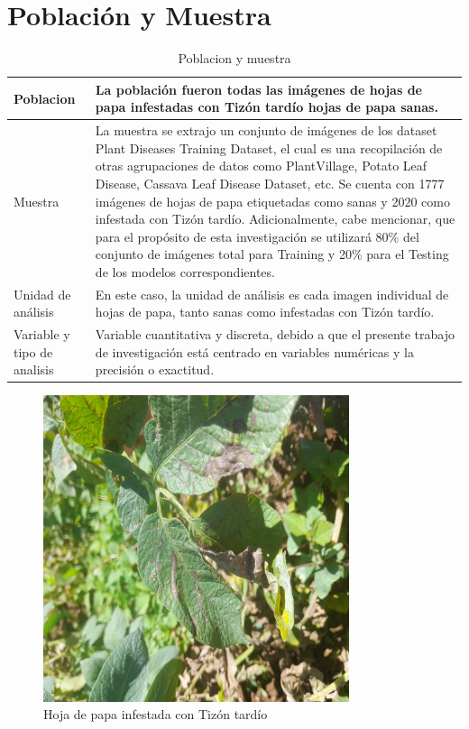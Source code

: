\section{Población y Muestra }

\begin{table}[H]
	\centering
	\caption{Poblacion y muestra }
	\label{tabla-2x4}
	\begin{tabular}{|p{3cm}|p{9cm}|}
		\hline
		 Poblacion &  La población fueron todas las imágenes de hojas de papa infestadas con Tizón tardío hojas de papa sanas.  \\ \hline
		 Muestra &  La muestra se extrajo un conjunto de imágenes de los dataset Plant Diseases Training Dataset, el cual es una recopilación de otras agrupaciones de datos como PlantVillage, Potato Leaf Disease, Cassava Leaf Disease Dataset, etc. Se cuenta con 1777 imágenes de hojas de papa etiquetadas como sanas y 2020 como infestada con Tizón tardío. Adicionalmente, cabe mencionar, que para el propósito de esta investigación se utilizará 80\% del conjunto de imágenes total para Training y 20\% para el Testing de los modelos correspondientes.\\ \hline
		Unidad de análisis &  En este caso, la unidad de análisis es cada imagen individual de hojas de papa, tanto sanas como infestadas con Tizón tardío. \\ \hline
		Variable y tipo de analisis & Variable cuantitativa y discreta, debido a que el presente trabajo de
		investigación está centrado en variables numéricas y la precisión o
		exactitud. \\ \hline
	\end{tabular}
\end{table}


\begin{figure}[H]
	\begin{center}
		\includegraphics[width=0.8\textwidth]{3/figures/img.jpg}
		\caption{Hoja de papa infestada con Tizón tardío}
		\label{fig1}
	\end{center}
	
\end{figure}

